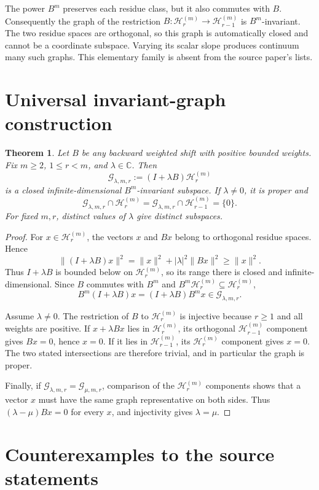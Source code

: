 \documentclass[11pt]{article}
\newtheorem{theorem}{Theorem}
\newcommand{\Hh}{\mathcal H}
\newcommand{\Gg}{\mathcal G}
\begin{document}
The power $B^m$ preserves each residue class, but it also commutes with $B$.
Consequently the graph of the restriction
$B:\Hh_r^{(m)}\to\Hh_{r-1}^{(m)}$ is $B^m$-invariant.  The two residue
spaces are orthogonal, so this graph is automatically closed and cannot be a
coordinate subspace.  Varying its scalar slope produces continuum many such
graphs.  This elementary family is absent from the source paper's lists.

\section{Universal invariant-graph construction}

\begin{theorem}\label{thm:graphs}
Let $B$ be any backward weighted shift with positive bounded weights.  Fix
$m\geq2$, $1\leq r<m$, and $\lambda\in\mathbb C$.  Then
\[
 \Gg_{\lambda,m,r}:=(I+\lambda B)\Hh_r^{(m)}
\]
is a closed infinite-dimensional $B^m$-invariant subspace.  If
$\lambda\neq0$, it is proper and
\[
 \Gg_{\lambda,m,r}\cap\Hh_r^{(m)}
 =\Gg_{\lambda,m,r}\cap\Hh_{r-1}^{(m)}=\{0\}.
\]
For fixed $m,r$, distinct values of $\lambda$ give distinct subspaces.
\end{theorem}

\begin{proof}
For $x\in\Hh_r^{(m)}$, the vectors $x$ and $Bx$ belong to orthogonal residue
spaces.  Hence
\[
 \|(I+\lambda B)x\|^2=\|x\|^2+|\lambda|^2\|Bx\|^2\geq\|x\|^2.
\]
Thus $I+\lambda B$ is bounded below on $\Hh_r^{(m)}$, so its range there is
closed and infinite-dimensional.  Since $B$ commutes with $B^m$ and
$B^m\Hh_r^{(m)}\subseteq\Hh_r^{(m)}$,
\[
 B^m(I+\lambda B)x=(I+\lambda B)B^m x\in\Gg_{\lambda,m,r}.
\]

Assume $\lambda\neq0$.  The restriction of $B$ to $\Hh_r^{(m)}$ is
injective because $r\geq1$ and all weights are positive.  If
$x+\lambda Bx$ lies in $\Hh_r^{(m)}$, its orthogonal
$\Hh_{r-1}^{(m)}$ component gives $Bx=0$, hence $x=0$.  If it lies in
$\Hh_{r-1}^{(m)}$, its $\Hh_r^{(m)}$ component gives $x=0$.  The two stated
intersections are therefore trivial, and in particular the graph is proper.

Finally, if $\Gg_{\lambda,m,r}=\Gg_{\mu,m,r}$, comparison of the
$\Hh_r^{(m)}$ components shows that a vector $x$ must have the same graph
representative on both sides.  Thus $(\lambda-\mu)Bx=0$ for every $x$, and
injectivity gives $\lambda=\mu$.
\end{proof}

\section{Counterexamples to the source statements}
\end{document}
